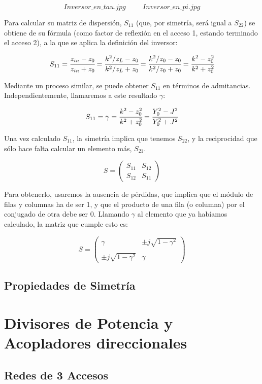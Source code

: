 \documentclass[12pt]{article}
\begin{document}
$$Inversor\_en\_tau.jpg \hspace{1cm} Inversor\_en\_pi.jpg$$

Para calcular su matriz de dispersi\'on, $S_{11}$ (que, por simetr\'ia, ser\'a igual a $S_{22}$) se obtiene de su f\'ormula (como factor de reflexi\'on en el acceso 1, estando terminado el acceso 2), a la que se aplica la definici\'on del inversor:

$$S_{11} = \cfrac{z_{in} - z_0}{z_{in} + z_0} = \cfrac{k^2/z_L - z_0}{k^2/z_L + z_0} = \cfrac{k^2/z_0 - z_0}{k^2/z_0 + z_0} = \cfrac{k^2 - z_0^2}{k^2 + z_0^2}$$

Mediante un proceso similar, se puede obtener $S_{11}$ en t\'erminos de admitancias. Independientemente, llamaremos a este resultado $\gamma$:

$$S_{11} = \gamma = \cfrac{k^2 - z_0^2}{k^2 + z_0^2} = \cfrac{Y_0^2 - J^2}{Y_0^2 + J^2}$$

Una vez calculado $S_{11}$, la simetr\'ia implica que tenemos $S_{22}$, y la reciprocidad que s\'olo hace falta calcular un elemento m\'as, $S_{21}$.

$$S=\left(\begin{array}{cc}
	S_{11} & S_{12}\\
	S_{12} & S_{11}
\end{array}\right)$$

Para obtenerlo, usaremos la ausencia de p\'erdidas, que implica que el m\'odulo de filas y columnas ha de ser 1, y que el producto de una fila (o columna) por el conjugado de otra debe ser 0. Llamando $\gamma$ al elemento que ya hab\'iamos calculado, la matriz que cumple esto es:

$$S=\left(\begin{array}{cc}
	\gamma & \pm j\sqrt{1-\gamma^2}\\
	\\ %
	\pm j\sqrt{1-\gamma^2} & \gamma
\end{array}\right)$$



\subsection{Propiedades de Simetr\'ia}

\section{Divisores de Potencia y Acopladores direccionales}
\subsection{Redes de 3 Accesos}
\end{document}
